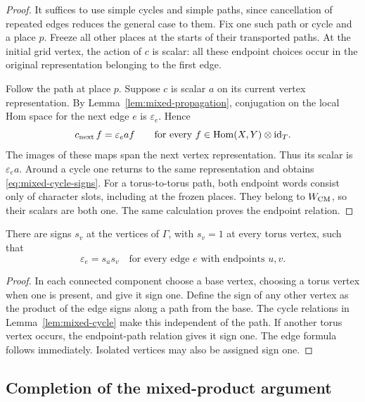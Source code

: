 \begin{proof}
It suffices to use simple cycles and simple paths, since cancellation
of repeated edges reduces the general case to them.  Fix one such
path or cycle and a place $p$.  Freeze all other places at the
starts of their transported paths.  At the initial grid vertex,
the action of $c$ is scalar: all these endpoint choices occur in
the original representation belonging to the first edge.

Follow the path at place $p$.  Suppose $c$ is scalar $a$ on its
current vertex representation.  By
Lemma~\ref{lem:mixed-propagation}, conjugation on the local Hom
space for the next edge $e$ is $\varepsilon_e$.  Hence
\[
 c_{\rm next}\,f=\varepsilon_e a f
 \qquad
 \text{for every }f\in\operatorname{Hom}(X,Y)\otimes\mathrm{id}_T.
\]
The images of these maps span the next vertex representation.
Thus its scalar is $\varepsilon_e a$.  Around a cycle one returns
to the same representation and obtains
\eqref{eq:mixed-cycle-signs}.  For a torus-to-torus path, both
endpoint words consist only of character slots, including at the
frozen places.  They belong to $W_{\rm CM}$, so their scalars are
both one.  The same calculation proves the endpoint relation.
\end{proof}

\begin{lemma}\label{lem:mixed-node-signs}
There are signs $s_v$ at the vertices of $\Gamma$, with $s_v=1$
at every torus vertex, such that
\[
 \varepsilon_e=s_us_v
 \quad\text{for every edge }e\text{ with endpoints }u,v.
\]
\end{lemma}

\begin{proof}
In each connected component choose a base vertex, choosing a torus
vertex when one is present, and give it sign one.  Define the sign
of any other vertex as the product of the edge signs along a path
from the base.  The cycle relations in
Lemma~\ref{lem:mixed-cycle} make this independent of the path.
If another torus vertex occurs, the endpoint-path relation gives
it sign one.  The edge formula follows immediately.  Isolated
vertices may also be assigned sign one.
\end{proof}

\subsection{Completion of the mixed-product argument}

